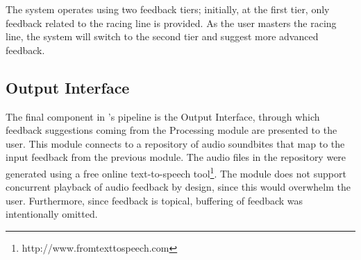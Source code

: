 \documentclass{sig-alternate}
\begin{document}
The system operates using two feedback tiers; initially, at the first tier, only feedback related to the racing line is provided. As the user masters the racing line, the system will switch to the second tier and suggest more advanced feedback.

\subsection{Output Interface}
The final component in \methodname's pipeline is the Output Interface, through which feedback suggestions coming from the Processing module are presented to the user. This module connects to a repository of audio soundbites that map to the input feedback from the previous module. The audio files in the repository were generated using a free online text-to-speech tool\footnote{http://www.fromtexttospeech.com}. The module does not support concurrent playback of audio feedback by design, since this would overwhelm the user. Furthermore, since feedback is topical, buffering of feedback was intentionally omitted.
\end{document}
